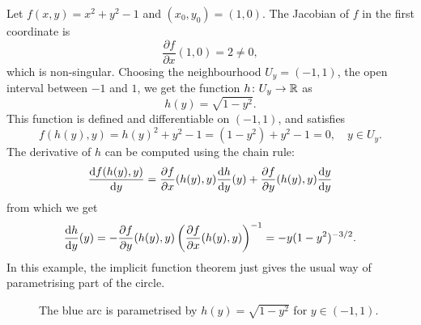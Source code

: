 \documentclass[11pt,a4paper]{memoir}
\begin{document}
\begin{example}
 Let $f(x,y)=x^2+y^2-1$ and $(x_0,y_0)=(1,0)$. The Jacobian of $f$ in the first coordinate is
 \begin{equation*}
  \frac{\partial f}{\partial x}(1,0) = 2 \neq 0, 
 \end{equation*}
which is non-singular. Choosing the neighbourhood $U_y=(-1,1)$, the open interval between $-1$ and $1$, we get the function $h\colon U_y\to \mathbb{R}$ as
\begin{equation*}
 h(y) = \sqrt{1-y^2}.
\end{equation*}
This function is defined and differentiable on $(-1,1)$, and satisfies
\begin{equation*}
 f(h(y),y) = h(y)^2+y^2-1 = (1-y^2)+y^2-1 = 0, \quad y\in U_y.
\end{equation*}
The derivative of $h$ can be computed using the chain rule:
\begin{equation*}
 \frac{\mathrm{d}{f}(h(y),y)}{\mathrm{d}{y}} = \frac{\partial f}{\partial x}(h(y),y)\frac{\mathrm{d}{h}}{\mathrm{d}{y}}(y)+\frac{\partial f}{\partial y}(h(y),y)\frac{\mathrm{d}{y}}{\mathrm{d}{y}} 
\end{equation*}
from which we get
\begin{equation*}
 \frac{\mathrm{d}{h}}{\mathrm{d}{y}}(y) = -\frac{\partial f}{\partial y}(h(y),y)\left(\frac{\partial f}{\partial x}(h(y),y)\right)^{-1} = -y(1-y^2)^{-3/2}.
\end{equation*}
In this example, the implicit function theorem just gives the usual way of parametrising part of the circle.

\begin{figure}[ht!]
\centering
{}
\caption{The blue arc is parametrised by $h(y)=\sqrt{1-y^2}$ for $y\in (-1,1)$.}
\end{figure}

\end{example}
\end{document}

